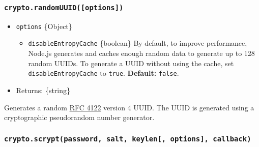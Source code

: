 \subsubsection{\texorpdfstring{\texttt{crypto.randomUUID({[}options{]})}}{crypto.randomUUID({[}options{]})}}\label{crypto.randomuuidoptions}

\begin{itemize}
\tightlist
\item
  \texttt{options} \{Object\}

  \begin{itemize}
  \tightlist
  \item
    \texttt{disableEntropyCache} \{boolean\} By default, to improve
    performance, Node.js generates and caches enough random data to
    generate up to 128 random UUIDs. To generate a UUID without using
    the cache, set \texttt{disableEntropyCache} to \texttt{true}.
    \textbf{Default:} \texttt{false}.
  \end{itemize}
\item
  Returns: \{string\}
\end{itemize}

Generates a random \href{https://www.rfc-editor.org/rfc/rfc4122.txt}{RFC
4122} version 4 UUID. The UUID is generated using a cryptographic
pseudorandom number generator.

\subsubsection{\texorpdfstring{\texttt{crypto.scrypt(password,\ salt,\ keylen{[},\ options{]},\ callback)}}{crypto.scrypt(password, salt, keylen{[}, options{]}, callback)}}\label{crypto.scryptpassword-salt-keylen-options-callback}

